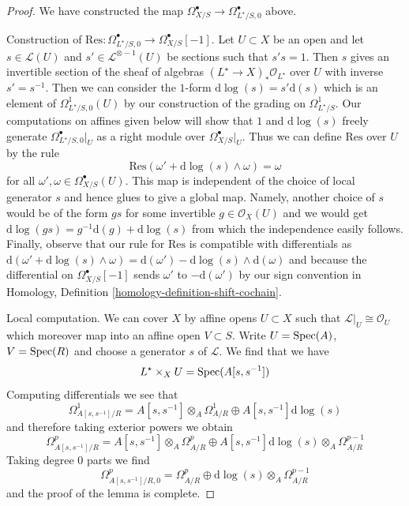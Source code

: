 \begin{proof}
We have constructed the map
$\Omega^\bullet_{X/S} \to \Omega^\bullet_{L^\star/S, 0}$ above.

\medskip\noindent
Construction of
$\text{Res} : \Omega^\bullet_{L^\star/S, 0} \to \Omega^\bullet_{X/S}[-1]$.
Let $U \subset X$ be an open and let $s \in \mathcal{L}(U)$
and $s' \in \mathcal{L}^{\otimes -1}(U)$ be sections such that
$s' s = 1$. Then $s$ gives an invertible section of the sheaf of
algebras $(L^\star \to X)_*\mathcal{O}_{L^\star}$ over $U$
with inverse $s' = s^{-1}$. Then we can consider the $1$-form
$\text{d}\log(s) = s' \text{d}(s)$ which is an element of
$\Omega^1_{L^\star/S, 0}(U)$ by our construction of the grading on
$\Omega^1_{L^\star/S}$. Our computations on affines given below
will show that $1$ and $\text{d}\log(s)$ freely generate
$\Omega^\bullet_{L^\star/S, 0}|_U$ as a right module over
$\Omega^\bullet_{X/S}|_U$.
Thus we can define $\text{Res}$ over $U$ by the rule
$$
\text{Res}(\omega' + \text{d}\log(s) \wedge \omega) = \omega
$$
for all $\omega', \omega \in \Omega^\bullet_{X/S}(U)$. This
map is independent of the choice of local generator $s$ and hence
glues to give a global map. Namely, another choice of $s$
would be of the form $gs$ for some invertible $g \in \mathcal{O}_X(U)$
and we would get $\text{d}\log(gs) = g^{-1}\text{d}(g) + \text{d}\log(s)$
from which the independence easily follows.
Finally, observe that our rule for $\text{Res}$
is compatible with differentials
as $\text{d}(\omega' + \text{d}\log(s) \wedge \omega) =
\text{d}(\omega') - \text{d}\log(s) \wedge \text{d}(\omega)$
and because the differential on $\Omega^\bullet_{X/S}[-1]$
sends $\omega'$ to $-\text{d}(\omega')$ by our sign convention in
Homology, Definition \ref{homology-definition-shift-cochain}.

\medskip\noindent
Local computation. We can cover $X$ by affine opens $U \subset X$
such that $\mathcal{L}|_U \cong \mathcal{O}_U$ which moreover map
into an affine open $V \subset S$. Write $U = \mathop{\mathrm{Spec}}(A)$, $V = \mathop{\mathrm{Spec}}(R)$
and choose a generator $s$ of $\mathcal{L}$. We find that we have
$$
L^\star \times_X U = \mathop{\mathrm{Spec}}(A[s, s^{-1}])
$$
Computing differentials we see that
$$
\Omega^1_{A[s, s^{-1}]/R} =
A[s, s^{-1}] \otimes_A \Omega^1_{A/R} \oplus A[s, s^{-1}] \text{d}\log(s)
$$
and therefore taking exterior powers we obtain
$$
\Omega^p_{A[s, s^{-1}]/R} =
A[s, s^{-1}] \otimes_A \Omega^p_{A/R}
\oplus
A[s, s^{-1}] \text{d}\log(s) \otimes_A \Omega^{p - 1}_{A/R}
$$
Taking degree $0$ parts we find
$$
\Omega^p_{A[s, s^{-1}]/R, 0} =
\Omega^p_{A/R} \oplus \text{d}\log(s) \otimes_A \Omega^{p - 1}_{A/R}
$$
and the proof of the lemma is complete.
\end{proof}

